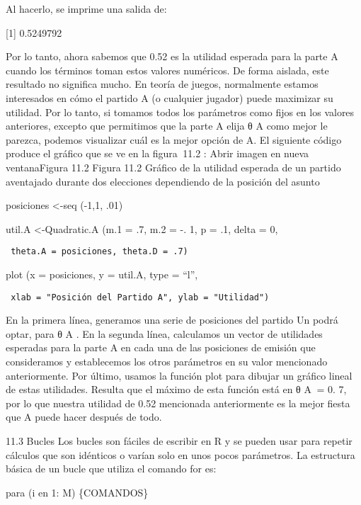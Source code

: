 \documentclass[
]{book}
\begin{document}
Al hacerlo, se imprime una salida de:

{[}1{]} 0.5249792

Por lo tanto, ahora sabemos que 0.52 es la utilidad esperada para la parte A cuando los términos toman estos valores numéricos. De forma aislada, este resultado no significa mucho. En teoría de juegos, normalmente estamos interesados \hspace{0pt}\hspace{0pt}en cómo el partido A (o cualquier jugador) puede maximizar su utilidad. Por lo tanto, si tomamos todos los parámetros como fijos en los valores anteriores, excepto que permitimos que la parte A elija θ A como mejor le parezca, podemos visualizar cuál es la mejor opción de A. El siguiente código produce el gráfico que se ve en la figura  11.2 :
Abrir imagen en nueva ventanaFigura 11.2
Figura 11.2
Gráfico de la utilidad esperada de un partido aventajado durante dos elecciones dependiendo de la posición del asunto

posiciones \textless-seq (-1,1, .01)

util.A \textless-Quadratic.A (m.1 = .7, m.2 = -. 1, p = .1, delta = 0,

\begin{verbatim}
 theta.A = posiciones, theta.D = .7)
\end{verbatim}

plot (x = posiciones, y = util.A, type = ``l'',

\begin{verbatim}
 xlab = "Posición del Partido A", ylab = "Utilidad")
\end{verbatim}

En la primera línea, generamos una serie de posiciones del partido Un podrá optar, para θ A . En la segunda línea, calculamos un vector de utilidades esperadas para la parte A en cada una de las posiciones de emisión que consideramos y establecemos los otros parámetros en su valor mencionado anteriormente. Por último, usamos la función plot para dibujar un gráfico lineal de estas utilidades. Resulta que el máximo de esta función está en θ A  = 0. 7, por lo que nuestra utilidad de 0.52 mencionada anteriormente es la mejor fiesta que A puede hacer después de todo.

11.3 Bucles
Los bucles son fáciles de escribir en R y se pueden usar para repetir cálculos que son idénticos o varían solo en unos pocos parámetros. La estructura básica de un bucle que utiliza el comando for es:

para (i en 1: M) \{COMANDOS\}
\end{document}
